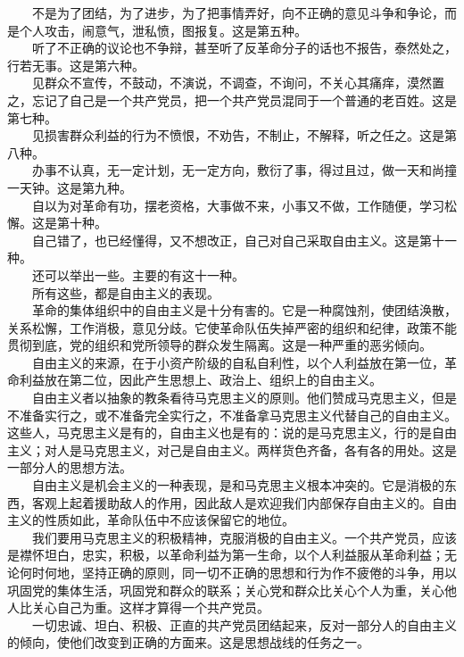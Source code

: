 \documentclass[cn,11pt,chinese]{elegantbook}
\begin{document}
　　不是为了团结，为了进步，为了把事情弄好，向不正确的意见斗争和争论，而是个人攻击，闹意气，泄私愤，图报复。这是第五种。\\
　　听了不正确的议论也不争辩，甚至听了反革命分子的话也不报告，泰然处之，行若无事。这是第六种。\\
　　见群众不宣传，不鼓动，不演说，不调查，不询问，不关心其痛痒，漠然置之，忘记了自己是一个共产党员，把一个共产党员混同于一个普通的老百姓。这是第七种。\\
　　见损害群众利益的行为不愤恨，不劝告，不制止，不解释，听之任之。这是第八种。\\
　　办事不认真，无一定计划，无一定方向，敷衍了事，得过且过，做一天和尚撞一天钟。这是第九种。\\
　　自以为对革命有功，摆老资格，大事做不来，小事又不做，工作随便，学习松懈。这是第十种。\\
　　自己错了，也已经懂得，又不想改正，自己对自己采取自由主义。这是第十一种。\\
　　还可以举出一些。主要的有这十一种。\\
　　所有这些，都是自由主义的表现。\\
　　革命的集体组织中的自由主义是十分有害的。它是一种腐蚀剂，使团结涣散，关系松懈，工作消极，意见分歧。它使革命队伍失掉严密的组织和纪律，政策不能贯彻到底，党的组织和党所领导的群众发生隔离。这是一种严重的恶劣倾向。\\
　　自由主义的来源，在于小资产阶级的自私自利性，以个人利益放在第一位，革命利益放在第二位，因此产生思想上、政治上、组织上的自由主义。\\
　　自由主义者以抽象的教条看待马克思主义的原则。他们赞成马克思主义，但是不准备实行之，或不准备完全实行之，不准备拿马克思主义代替自己的自由主义。这些人，马克思主义是有的，自由主义也是有的：说的是马克思主义，行的是自由主义；对人是马克思主义，对己是自由主义。两样货色齐备，各有各的用处。这是一部分人的思想方法。\\
　　自由主义是机会主义的一种表现，是和马克思主义根本冲突的。它是消极的东西，客观上起着援助敌人的作用，因此敌人是欢迎我们内部保存自由主义的。自由主义的性质如此，革命队伍中不应该保留它的地位。\\
　　我们要用马克思主义的积极精神，克服消极的自由主义。一个共产党员，应该是襟怀坦白，忠实，积极，以革命利益为第一生命，以个人利益服从革命利益；无论何时何地，坚持正确的原则，同一切不正确的思想和行为作不疲倦的斗争，用以巩固党的集体生活，巩固党和群众的联系；关心党和群众比关心个人为重，关心他人比关心自己为重。这样才算得一个共产党员。\\
　　一切忠诚、坦白、积极、正直的共产党员团结起来，反对一部分人的自由主义的倾向，使他们改变到正确的方面来。这是思想战线的任务之一。\\
\end{document}
